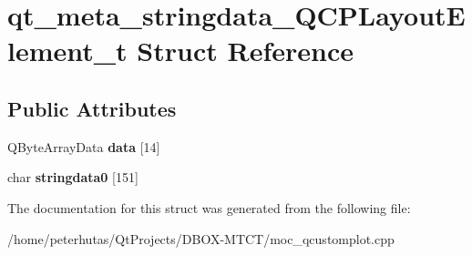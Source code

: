 \hypertarget{structqt__meta__stringdata___q_c_p_layout_element__t}{}\section{qt\+\_\+meta\+\_\+stringdata\+\_\+\+Q\+C\+P\+Layout\+Element\+\_\+t Struct Reference}
\label{structqt__meta__stringdata___q_c_p_layout_element__t}
\subsection*{Public Attributes}
\begin{DoxyCompactItemize}
\item 
\mbox{\label{structqt__meta__stringdata___q_c_p_layout_element__t_af0ea5ebb7857a9736eb348abd41c58dc}} 
Q\+Byte\+Array\+Data {\bfseries data} \mbox{[}14\mbox{]}
\item 
\mbox{\label{structqt__meta__stringdata___q_c_p_layout_element__t_a9f6b0973752e4c3c20011438c7a6351c}} 
char {\bfseries stringdata0} \mbox{[}151\mbox{]}
\end{DoxyCompactItemize}


The documentation for this struct was generated from the following file\+:\begin{DoxyCompactItemize}
\item 
/home/peterhutas/\+Qt\+Projects/\+D\+B\+O\+X-\/\+M\+T\+C\+T/moc\+\_\+qcustomplot.\+cpp\end{DoxyCompactItemize}
